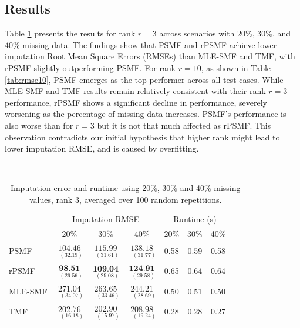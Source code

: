 \documentclass{mldsmsc}
\begin{document}
\subsection{Results}

\noindent Table \ref{tab:rmse3} presents the results for rank $r = 3$ across scenarios with $20\%$, $30\%$, and $40\%$ missing data. The findings show that PSMF and rPSMF achieve lower imputation Root Mean Square Errors (RMSEs) than MLE-SMF and TMF, with rPSMF slightly outperforming PSMF. For rank $r = 10$, as shown in Table \ref{tab:rmse10}, PSMF emerges as the top performer across all test cases. While MLE-SMF and TMF results remain relatively consistent with their rank $r = 3$ performance, rPSMF shows a significant decline in performance, severely worsening as the percentage of missing data increases. PSMF's performance is also worse than for $r = 3$ but it is not that much affected as rPSMF. This observation contradicts our initial hypothesis that higher rank might lead to lower imputation RMSE, and is caused by overfitting. \newline

\begin{table}[H]
\centering
{} \\[0.5ex]
\begin{tabular}{@{}lccc|ccccc@{}}
\toprule
 & \multicolumn{3}{c}{Imputation RMSE} & \multicolumn{3}{c}{Runtime (s)} \\
 & 20\% & 30\% & 40\% & 20\% & 30\% & 40\% \\
\midrule
PSMF & $\underset{{\scriptscriptstyle \;\;(32.19)}}{104.46}$ & $\underset{{\scriptscriptstyle \;\;(31.61)}}{115.99}$ & $\underset{{\scriptscriptstyle \;\;\;(31.77)}}{138.18}$ & 0.58 & 0.59 & 0.58 \\
rPSMF & $\underset{{\scriptscriptstyle \;\;(26.56)}}{\textbf{98.51}}$ & $\underset{{\scriptscriptstyle \;\;(29.08)}}{\textbf{109.04}}$ & $\underset{{\scriptscriptstyle \;\;(29.58)}}{\textbf{124.91}}$ & 0.65 & 0.64 & 0.64 \\
MLE-SMF & $\underset{{\scriptscriptstyle \;\;\;(34.07)}}{271.04}$ & $\underset{{\scriptscriptstyle \;\;\;(33.46)}}{263.65}$ & $\underset{{\scriptscriptstyle \;\;\;(28.69)}}{244.21}$ & 0.50 & 0.51 & 0.50 \\
TMF & $\underset{{\scriptscriptstyle \;\;\;(16.18)}}{202.76}$ & $\underset{{\scriptscriptstyle \;\;\;(15.97)}}{202.90}$ & $\underset{{\scriptscriptstyle \;\;\;(19.24)}}{208.98}$ & 0.28 & 0.28 & 0.27 \\
\bottomrule
\end{tabular}
\caption{Imputation error and runtime using 20\%, 30\% and 40\% missing values, rank 3, averaged over 100 random repetitions.}
\label{tab:rmse3}
\end{table}
\end{document}
